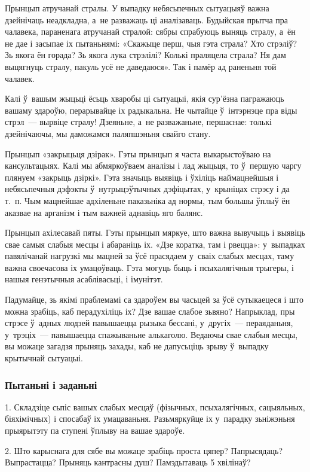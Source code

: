 Прынцып атручанай стралы. У выпадку небясьпечных сытуацыяў важна дзейнічаць неадкладна, а~не разважаць ці аналізаваць. Будыйская прытча пра чалавека, параненага атручанай стралой: сябры спрабуюць выняць стралу, а~ён не дае і засыпае іх пытаньнямі: «Скажыце перш, чыя гэта страла? Хто стрэліў? Зь якога ён горада? Зь якога лука стрэлілі? Колькі праляцела страла? Ня дам выцягнуць стралу, пакуль усё не даведаюся». Так і памёр ад раненьня той чалавек.

Калі ў~вашым жыцьці ёсьць хваробы ці сытуацыі, якія сур'ёзна пагражаюць вашаму здароўю, перарывайце іх радыкальна. Не чытайце ў~інтэрнэце пра віды стрэл~--- вырвіце стралу! Дзеяньне, а~не разважаньне, першаснае: толькі дзейнічаючы, мы даможамся паляпшэньня свайго стану.

Прынцып «закрыцьця дзірак». Гэты прынцып я часта выкарыстоўваю на кансультацыях. Калі мы абмяркоўваем аналізы і лад жыцьця, то ў~першую чаргу плянуем «закрыць дзіркі». Гэта значыць выявіць і ўхіліць наймацнейшыя і небясьпечныя дэфэкты ў~нутрыцэўтычных дэфіцытах, у~крыніцах стрэсу і да т.~п. Чым мацнейшае адхіленьне паказьніка ад нормы, тым большы ўплыў ён аказвае на арганізм і тым важней аднавіць яго балянс.

Прынцып ахілесавай пяты. Гэты прынцып мяркуе, што важна вывучыць і выявіць свае самыя слабыя месцы і абараніць іх. «Дзе коратка, там і рвецца»: у~выпадках павялічанай нагрузкі мы мацней за ўсё прасядаем у~сваіх слабых месцах, таму важна своечасова іх умацоўваць. Гэта могуць быць і псыхалягічныя трыгеры, і нашыя генэтычныя асаблівасьці, і імунітэт.

Падумайце, зь якімі праблемамі са здароўем вы часьцей за ўсё сутыкаецеся і што можна зрабіць, каб перадухіліць іх? Дзе вашае слабое зьвяно? Напрыклад, пры стрэсе ў~адных людзей павышаецца рызыка бессані, у~другіх~--- пераяданьня, у~трэціх~--- павышаецца спажываньне алькаголю. Ведаючы свае слабыя месцы, вы можаце загадзя прыняць захады, каб не дапусьціць зрыву ў~выпадку крытычнай сытуацыі.

\subsubsection{Пытаньні і заданьні}

1. Складзіце сьпіс вашых слабых месцаў (фізычных, псыхалягічных, сацыяльных, біяхімічных) і спосабаў іх умацаваньня. Разьмяркуйце іх у~парадку зьніжэньня прыярытэту па ступені ўплыву на вашае здароўе.

2. Што карыснага для сябе вы можаце зрабіць проста цяпер? Папрысядаць? Выпрастацца? Прыняць кантрасны душ? Памэдытаваць 5 хвілінаў?

